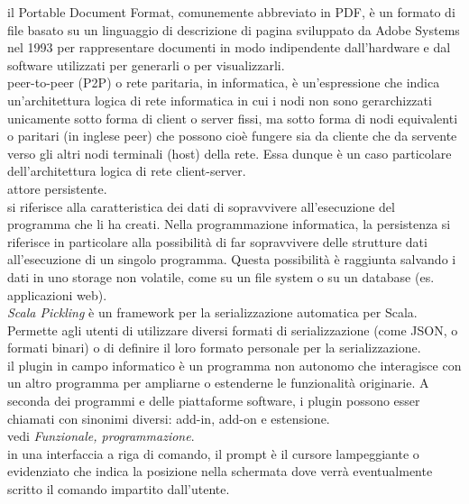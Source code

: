 \documentclass{scalatekids-article}
\begin{document}
   il Portable Document Format, comunemente abbreviato in PDF, è un formato di file basato su un linguaggio di descrizione di pagina sviluppato da Adobe Systems nel 1993 per rappresentare documenti in modo indipendente dall'hardware e dal software utilizzati per generarli o per visualizzarli.
  \\

   peer-to-peer (P2P) o rete paritaria, in informatica, è un'espressione che indica un'architettura logica di rete informatica in cui i nodi non sono gerarchizzati unicamente sotto forma di client o server fissi, ma sotto forma di nodi equivalenti o paritari (in inglese peer) che possono cioè fungere sia da cliente che da servente verso gli altri nodi terminali (host) della rete. Essa dunque è un caso particolare dell'architettura logica di rete client-server.
  \\

   attore persistente.
  \\
  
   si riferisce alla caratteristica dei dati di sopravvivere all'esecuzione del programma che li ha creati. Nella programmazione informatica, la persistenza si riferisce in particolare alla possibilità di far sopravvivere delle strutture dati all'esecuzione di un singolo programma. Questa possibilità è raggiunta salvando i dati in uno storage non volatile, come su un file system o su un database (es. applicazioni web).
  \\

   \textit{Scala Pickling} è un framework per la serializzazione automatica per Scala. Permette agli utenti di utilizzare diversi formati di serializzazione (come JSON, o formati binari) o di definire il loro formato personale per la serializzazione.
  \\

   il plugin in campo informatico è un programma non autonomo che interagisce con un altro programma per ampliarne o estenderne le funzionalità originarie.
  A seconda dei programmi e delle piattaforme software, i plugin possono esser chiamati con sinonimi diversi: add-in, add-on e estensione.
  \\
  
   vedi \textit{Funzionale, programmazione}.
  \\
  
   in una interfaccia a riga di comando, il prompt è il cursore lampeggiante o evidenziato che indica la posizione nella schermata dove verrà eventualmente scritto il comando impartito dall'utente.
  \\
\end{document}
